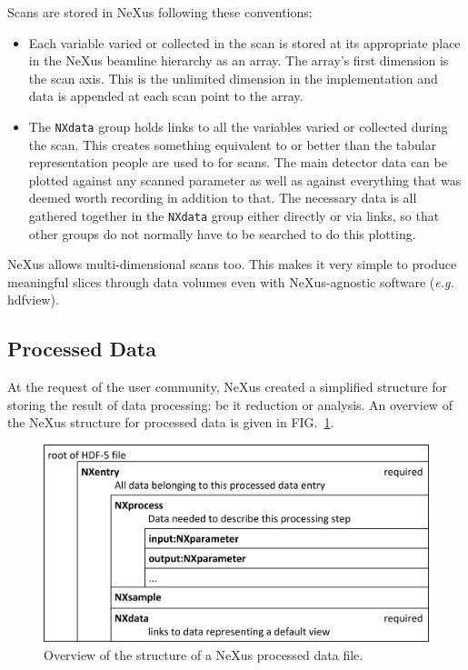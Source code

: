 \documentclass[%
 aip,
rsi,
 amsmath,amssymb,
 reprint,%
]{revtex4-1}
\begin{document}
Scans are stored in NeXus following these conventions: 
\begin{itemize}
\item Each variable varied or collected in the scan is stored at its appropriate place in the NeXus beamline 
 hierarchy as an array. The array's first dimension is the scan axis. This is the unlimited dimension in 
 the implementation and data is appended at each scan point to the array. 
\item The \texttt{NXdata} group holds links to all the variables varied or collected during the scan. 
 This creates something equivalent to or better than the tabular representation people are used to for scans. 
 The main detector data can be plotted against any scanned parameter as well as against everything that was 
 deemed worth recording in addition to that.  The necessary data is all gathered together in the \texttt{NXdata}
 group either directly or via links, so that other groups do not
 normally have to be searched to do this plotting.
 
\end{itemize}

NeXus allows multi-dimensional scans too. This makes it very simple to produce meaningful slices through data 
volumes even with NeXus-agnostic software ({\it e.g.} hdfview). 



\subsection{Processed Data}

At the request of the user community, NeXus created a simplified structure for storing the result of data 
processing: be it reduction or analysis. 
An overview of the NeXus structure for processed data is given in FIG.~\ref{procfile}. 

\begin{figure}
\includegraphics[width=\columnwidth]{figure3}
\caption{\label{procfile}Overview of the structure of a NeXus processed data file.}
\end{figure}
\end{document}
